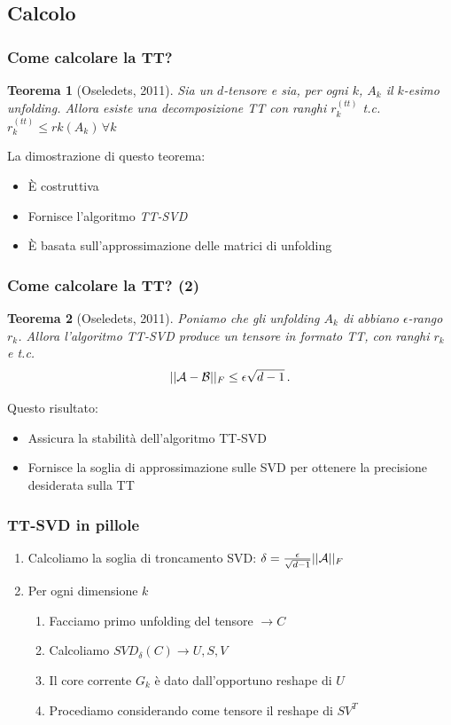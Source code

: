 \documentclass[compress]{beamer}
\newcommand{\nota}[1]{\textcolor{red}{#1}}
\theoremstyle{definition}
\theoremstyle{plain}
\newtheorem{teorema}{Teorema}
\begin{document}
\subsection{Calcolo}
\begin{frame}
\frametitle{Come calcolare la TT?}
\begin{teorema}[Oseledets, 2011]
Sia \A un $d$-tensore e sia, per ogni $k$, $A_k$ il $k$-esimo unfolding.
Allora esiste una decomposizione TT con ranghi $r_k^{(tt)}$ t.c. $r_k^{(tt)} \leq rk(A_k) \, \forall k$
\end{teorema}

\vspace{5mm}
La dimostrazione di questo teorema:
\begin{itemize}
	\item \`E costruttiva
	\item Fornisce l'algoritmo \emph{TT-SVD}
	\item \`E basata sull'approssimazione delle matrici di unfolding
\end{itemize}
\end{frame}

\begin{frame}
\frametitle{Come calcolare la TT? (2)}
\begin{teorema}[Oseledets, 2011]
Poniamo che gli unfolding $A_k$ di \A abbiano $\epsilon$-rango $r_k$.
Allora l'algoritmo TT-SVD produce un tensore \B in formato TT, con ranghi $r_k$ e t.c. 
\begin{equation*}
    ||\mathcal{A} - \mathcal{B} ||_F \le \epsilon \sqrt{d-1}\, .
\end{equation*}
\end{teorema}

\vspace{5mm}
Questo risultato:
\begin{itemize}
	\item Assicura la stabilità dell'algoritmo TT-SVD
	\item Fornisce la soglia di approssimazione sulle SVD per ottenere la precisione desiderata sulla TT
\end{itemize}
\end{frame}

\begin{frame}
\frametitle{TT-SVD in pillole}
\begin{enumerate}
	\item Calcoliamo la soglia di troncamento SVD: $\delta = \frac{\epsilon}{\sqrt{d-1}} ||\mathcal{A}||_F$
	\item Per ogni dimensione $k$
		\begin{enumerate}
			\item Facciamo primo unfolding del tensore $\rightarrow C$
			\item Calcoliamo $SVD_{\delta}(C) \rightarrow U,S,V$
			\item Il core corrente $G_k$ è dato dall'opportuno reshape di $U$
			\item Procediamo considerando come tensore il reshape di $SV^T$
		\end{enumerate}
\end{enumerate}
\end{frame}
\end{document}
